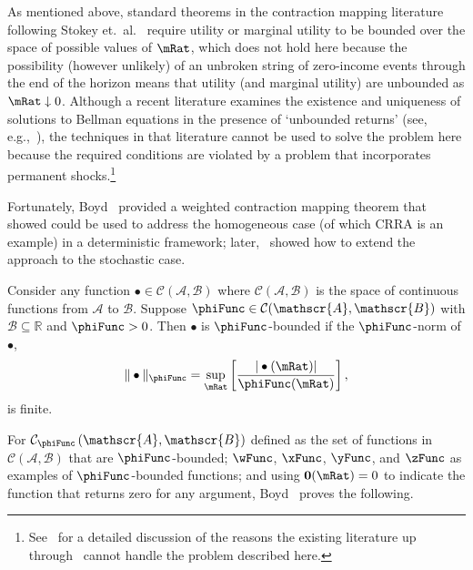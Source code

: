 \documentclass[ProjectDLO]{subfiles}
\begin{document}
As mentioned above, standard theorems in the contraction mapping literature following Stokey et.\ al.~\citeyearpar{slpMethods} require utility or marginal utility to be bounded over the space of possible values of $\mRat$, which does not hold here because the possibility (however unlikely) of an unbroken string of zero-income events through the end of the horizon means that utility (and marginal utility) are unbounded as $\mRat \downarrow 0$.  Although a recent literature examines the existence and uniqueness of solutions to Bellman equations in the presence of `unbounded returns' (see, e.g.,~\cite{mnUnique}), the techniques in that literature cannot be used to solve the problem here because the required conditions are violated by a problem that incorporates permanent shocks.\footnote{See~\cite{yaoNote} for a detailed discussion of the reasons the existing literature up through~\cite{mnUnique} cannot handle the problem described here.}

Fortunately, Boyd~\citeyearpar{jboydWeighted} provided a weighted contraction mapping theorem that~\cite{asHomogeneous} showed could be used to address the homogeneous case (of which CRRA is an example) in a deterministic framework; later,~\cite{duranDiscounting} showed how to extend the~\cite{jboydWeighted} approach to the stochastic case.
\begin{defn}
  Consider any function $\bullet\in \mathcal{C}(\mathscr{A},\mathscr{B})$ where $\mathcal{C}(\mathscr{A},\mathscr{B})$ is the space of continuous functions from $\mathscr{A}$ to $%
  \mathscr{B}$. Suppose $\phiFunc \in \mathcal{C}(\mathscr{A},\mathscr{B})$ with $%
  \mathscr{B}\subseteq\mathbb{R}$ and $\phiFunc >0$. Then $\bullet$ is $\phiFunc$-bounded if the $\phiFunc$-norm of $\bullet$,
  \begin{equation}
    \Vert \bullet\Vert _{\phiFunc }=\sup_{\mRat}\left[ \frac{|\bullet(\mRat)|}{\phiFunc (\mRat)}\right] ,
    \label{eq:phinorm}
  \end{equation}%
  is finite.
\end{defn}

For $\mathcal{C}_{\phiFunc }\left( \mathscr{A},\mathscr{B}\right) $ defined as the set of functions in $\mathcal{C}(\mathscr{A},\mathscr{B})$ that are $\phiFunc$-bounded; $\wFunc$, $\xFunc$, $\yFunc$, and $\zFunc$ as examples of $\phiFunc$-bounded functions; and using {$\mathbf{0}(\mRat)=0$} to indicate the function that returns zero for any argument, Boyd~\citeyearpar{jboydWeighted} proves the following.
\end{document}
